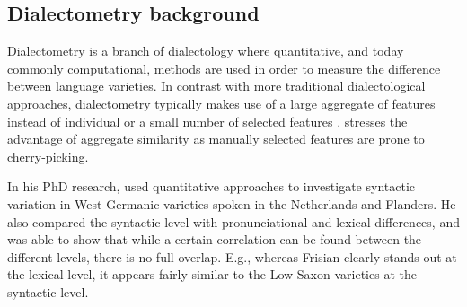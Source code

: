 \documentclass[output=paper,colorlinks,citecolor=brown]{langscibook}
\begin{document}
\subsection{Dialectometry background}
Dialectometry is a branch of dialectology where quantitative, and today commonly computational, methods are used in order to measure the difference between language varieties. In contrast with more traditional dialectological approaches, dialectometry typically makes use of a large aggregate of features instead of individual or a small number of selected features  \citep{WielingNerbonne2015}.  \citet{Nerbonne2009} stresses the advantage of aggregate similarity as manually selected features are prone to cherry-picking. %



In his PhD research, \citet{Spruit2008} used quantitative approaches to investigate syntactic variation in West Germanic varieties spoken in the Netherlands and Flanders. He also compared the syntactic level with pronunciational and lexical differences, and was able to show that while a certain correlation can be found between the different levels, there is no full overlap. E.g., whereas Frisian clearly stands out at the lexical level, it appears fairly similar to the Low Saxon varieties at the syntactic level. \citep[75--78]{Spruit2008}  %








\end{document}
